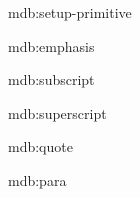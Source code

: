 

\startxmlsetups mdb:setup-primitive
\stopxmlsetups


\startxmlsetups mdb:emphasis
	{\em {}}
\stopxmlsetups

\startxmlsetups mdb:subscript
\stopxmlsetups

\startxmlsetups mdb:superscript
\stopxmlsetups

\startxmlsetups mdb:quote
\stopxmlsetups

\startxmlsetups mdb:para
	\par
\stopxmlsetups

